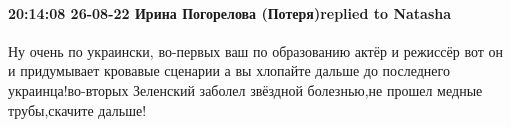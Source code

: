 \paragraph{20:14:08 26-08-22 Ирина Погорелова (Потеря)replied to Natasha}

Ну очень по украински, во-первых ваш по образованию актёр и режиссёр вот он и
придумывает кровавые сценарии а вы хлопайте дальше до последнего
украинца!во-вторых Зеленский заболел звёздной болезнью,не прошел медные
трубы,скачите дальше!
